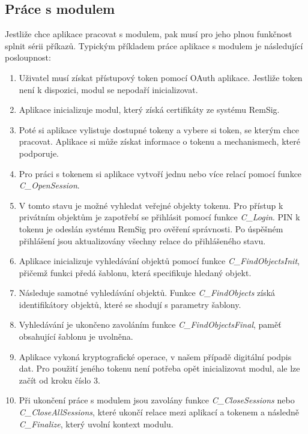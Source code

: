 \documentclass[]{fithesis3}
\begin{document}
	\subsection{Práce s modulem}
	
	Jestliže chce aplikace pracovat s modulem, pak musí pro jeho plnou funkčnost splnit sérii 			příkazů. Typickým příkladem práce aplikace s modulem je následující posloupnost:
	\begin{enumerate}
		\item Uživatel musí získat přístupový token pomocí OAuth aplikace. Jestliže token není k 			dispozici, modul se nepodaří inicializovat.
		\item Aplikace inicializuje modul, který získá certifikáty ze systému RemSig.
		\item Poté si aplikace vylistuje dostupné tokeny a vybere si token, se kterým chce 				pracovat. Aplikace si může získat informace o tokenu a mechanismech, které podporuje.
		\item Pro práci s tokenem si aplikace vytvoří jednu nebo více relací pomocí funkce 					\textit{C\_OpenSession}.
		\item V tomto stavu je možné vyhledat veřejné objekty tokenu. Pro přístup k privátním 			objektům je zapotřebí se přihlásit pomocí funkce \textit{C\_Login}. PIN k tokenu je 				odeslán systému RemSig pro ověření správnosti. Po úspěšném přihlášení jsou 					aktualizovány všechny relace do přihlášeného stavu.
		\item Aplikace inicializuje vyhledávání objektů pomocí funkce \textit{C\_FindObjectsInit}, 			přičemž funkci předá šablonu, která specifikuje hledaný objekt. 
		\item Následuje samotné vyhledávání objektů. Funkce \textit{C\_FindObjects} získá 				identifikátory objektů, které se shodují s parametry šablony.
		\item Vyhledávání je ukončeno zavoláním funkce \textit{C\_FindObjectsFinal}, paměť 				obsahující šablonu je uvolněna.
		\item Aplikace vykoná kryptografické operace, v našem případě digitální podpis dat. Pro 			použití jeného tokenu není potřeba opět inicializovat modul, ale lze začít od kroku číslo 				3.
		\item Při ukončení práce s modulem jsou zavolány funkce \textit{C\_CloseSessions} nebo 		\textit{C\_CloseAllSessions}, které ukončí relace mezi aplikací a tokenem a následně 				\textit{C\_Finalize}, který uvolní kontext modulu.
	\end{enumerate}
\end{document}
